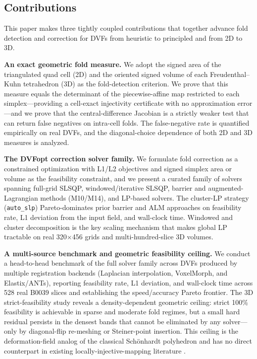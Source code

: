 \subsection{Contributions}
\label{sec:main_contributions}

This paper makes three tightly coupled contributions that together advance fold detection and correction for DVFs from heuristic to principled and from 2D to 3D.

\textbf{An exact geometric fold measure.} We adopt the signed area of the triangulated quad cell (2D) and the oriented signed volume of each Freudenthal--Kuhn tetrahedron (3D) as the fold-detection criterion. We prove that this measure equals the determinant of the piecewise-affine map restricted to each simplex---providing a cell-exact injectivity certificate with no approximation error---and we prove that the central-difference Jacobian is a strictly weaker test that can return false negatives on intra-cell folds. The false-negative rate is quantified empirically on real DVFs, and the diagonal-choice dependence of both 2D and 3D measures is analyzed.

\textbf{The DVFopt correction solver family.} We formulate fold correction as a constrained optimization with L1/L2 objectives and signed simplex area or volume as the feasibility constraint, and we present a curated family of solvers spanning full-grid SLSQP, windowed/iterative SLSQP, barrier and augmented-Lagrangian methods (M10/M14), and LP-based solvers. The cluster-LP strategy (\texttt{auto\_slp}) Pareto-dominates prior barrier and ALM approaches on feasibility rate, L1 deviation from the input field, and wall-clock time. Windowed and cluster decomposition is the key scaling mechanism that makes global LP tractable on real 320$\times$456 grids and multi-hundred-slice 3D volumes.

\textbf{A multi-source benchmark and geometric feasibility ceiling.} We conduct a head-to-head benchmark of the full solver family across DVFs produced by multiple registration backends (Laplacian interpolation, VoxelMorph, and Elastix/ANTs), reporting feasibility rate, L1 deviation, and wall-clock time across 528 real B0039 slices and establishing the speed/accuracy Pareto frontier. The 3D strict-feasibility study reveals a density-dependent geometric ceiling: strict 100\% feasibility is achievable in sparse and moderate fold regimes, but a small hard residual persists in the densest bands that cannot be eliminated by any solver---only by diagonal-flip re-meshing or Steiner-point insertion. This ceiling is the deformation-field analog of the classical Sch{\"o}nhardt polyhedron \cite{schonhardt1928} and has no direct counterpart in existing locally-injective-mapping literature \cite{schuller2013lim, garanzha2021foldfree}.



